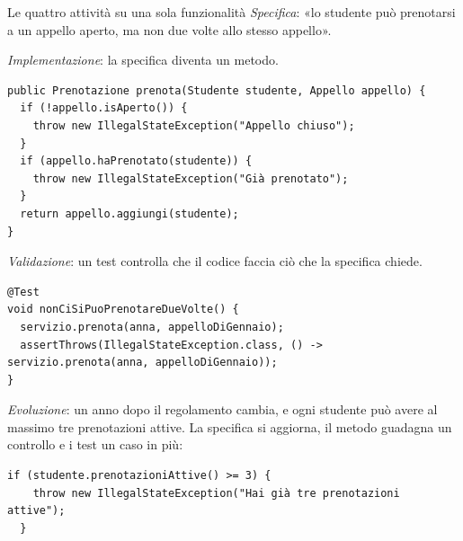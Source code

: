 \begin{esempio}{Le quattro attività su una sola funzionalità}
\textit{Specifica}: «lo studente può prenotarsi a un appello aperto, ma non due volte allo stesso appello».

\textit{Implementazione}: la specifica diventa un metodo.
\begin{lstlisting}[style=java, name=ServizioPrenotazioni.java]
public Prenotazione prenota(Studente studente, Appello appello) {
  if (!appello.isAperto()) {
    throw new IllegalStateException("Appello chiuso");
  }
  if (appello.haPrenotato(studente)) {
    throw new IllegalStateException("Già prenotato");
  }
  return appello.aggiungi(studente);
}
\end{lstlisting}
\textit{Validazione}: un test controlla che il codice faccia ciò che la specifica chiede.
\begin{lstlisting}[style=java, name=ServizioPrenotazioniTest.java]
@Test
void nonCiSiPuoPrenotareDueVolte() {
  servizio.prenota(anna, appelloDiGennaio);
  assertThrows(IllegalStateException.class, () -> servizio.prenota(anna, appelloDiGennaio));
}
\end{lstlisting}
\textit{Evoluzione}: un anno dopo il regolamento cambia, e ogni studente può avere al massimo tre prenotazioni attive.
La specifica si aggiorna, il metodo guadagna un controllo e i test un caso in più:
\begin{lstlisting}[style=java, name=ServizioPrenotazioni.java]
  if (studente.prenotazioniAttive() >= 3) {
    throw new IllegalStateException("Hai già tre prenotazioni attive");
  }
\end{lstlisting}
\end{esempio}


